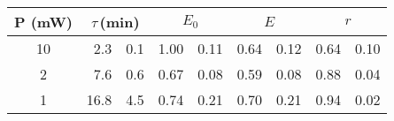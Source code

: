\begin{tabular}{cr@{$\,\pm\,$}lr@{$\,\pm\,$}lr@{$\,\pm\,$}lr@{$\,\pm\,$}l}
\toprule
P (mW)
   & \multicolumn{2}{c}{$\tau$\,(min)}
                 & \multicolumn{2}{c}{$E_0$}
                                & \multicolumn{2}{c}{$E$}
                                               & \multicolumn{2}{c}{$r$} \\
\midrule

10 &   2.3 & 0.1 &  1.00 & 0.11 &  0.64 & 0.12 &  0.64 & 0.10 \\
 2 &   7.6 & 0.6 &  0.67 & 0.08 &  0.59 & 0.08 &  0.88 & 0.04 \\
 1 &  16.8 & 4.5 &  0.74 & 0.21 &  0.70 & 0.21 &  0.94 & 0.02 \\
\bottomrule
\end{tabular}
